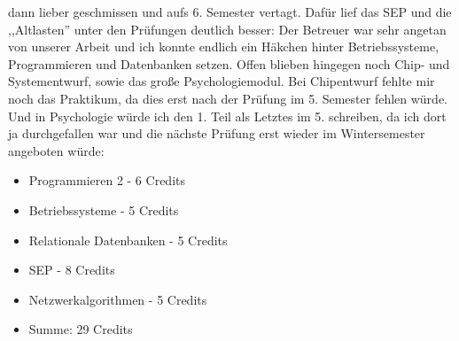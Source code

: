 dann lieber geschmissen und aufs 6. Semester vertagt. Dafür lief das
SEP und die ,,Altlasten'' unter den Prüfungen deutlich besser: Der
Betreuer war sehr angetan von unserer Arbeit und ich konnte endlich
ein Häkchen hinter Betriebssysteme, Programmieren und Datenbanken
setzen. Offen blieben hingegen noch Chip- und Systementwurf, sowie das
große Psychologiemodul. Bei Chipentwurf fehlte mir noch das Praktikum,
da dies erst nach der Prüfung im 5. Semester fehlen würde. Und in
Psychologie würde ich den 1. Teil als Letztes im 5. schreiben, da ich
dort ja durchgefallen war und die nächste Prüfung erst wieder im
Wintersemester angeboten würde:
\begin{itemize}
%
 \item Programmieren 2 - 6 Credits
 \item Betriebssysteme - 5 Credits
\item Relationale Datenbanken - 5 Credits
\item SEP - 8 Credits
\item Netzwerkalgorithmen       - 5 Credits
\item Summe: 29  Credits
\end{itemize}

